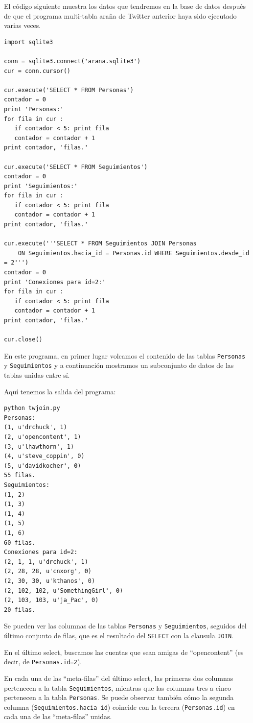 El código siguiente muestra los datos que tendremos en la
base de datos después de que el programa multi-tabla araña de Twitter anterior
haya sido ejecutado varias veces.

\beforeverb
\begin{verbatim}
import sqlite3

conn = sqlite3.connect('arana.sqlite3')
cur = conn.cursor()

cur.execute('SELECT * FROM Personas')
contador = 0
print 'Personas:'
for fila in cur :
   if contador < 5: print fila
   contador = contador + 1
print contador, 'filas.'

cur.execute('SELECT * FROM Seguimientos')
contador = 0
print 'Seguimientos:'
for fila in cur :
   if contador < 5: print fila
   contador = contador + 1
print contador, 'filas.'

cur.execute('''SELECT * FROM Seguimientos JOIN Personas 
    ON Seguimientos.hacia_id = Personas.id WHERE Seguimientos.desde_id = 2''')
contador = 0
print 'Conexiones para id=2:'
for fila in cur :
   if contador < 5: print fila
   contador = contador + 1
print contador, 'filas.'

cur.close()
\end{verbatim}
\afterverb
%
En este programa, en primer lugar volcamos el contenido de las tablas {\tt Personas}
y {\tt Seguimientos} y a continuación mostramos un subconjunto de
datos de las tablas unidas entre sí.

Aquí tenemos la salida del programa:

\beforeverb
\begin{verbatim}
python twjoin.py 
Personas:
(1, u'drchuck', 1)
(2, u'opencontent', 1)
(3, u'lhawthorn', 1)
(4, u'steve_coppin', 0)
(5, u'davidkocher', 0)
55 filas.
Seguimientos:
(1, 2)
(1, 3)
(1, 4)
(1, 5)
(1, 6)
60 filas.
Conexiones para id=2:
(2, 1, 1, u'drchuck', 1)
(2, 28, 28, u'cnxorg', 0)
(2, 30, 30, u'kthanos', 0)
(2, 102, 102, u'SomethingGirl', 0)
(2, 103, 103, u'ja_Pac', 0)
20 filas.
\end{verbatim}
\afterverb
%
Se pueden ver las columnas de las tablas {\tt Personas} y {\tt Seguimientos}, seguidos del último
conjunto de filas, que es el resultado del {\tt SELECT} con la clausula {\tt JOIN}.

En el último select, buscamos las cuentas que sean amigas de
``opencontent'' (es decir, de {\tt Personas.id=2}).

En cada una de las ``meta-filas'' del último select, las primeras dos columnas pertenecen
a la tabla {\tt Seguimientos}, mientras que las columnas tres a cinco pertenecen a la tabla
{\tt Personas}. Se puede observar también cómo la segunda columna (\verb"Seguimientos.hacia_id")
coincide con la tercera ({\tt Personas.id}) en cada una de las ``meta-filas'' unidas.

